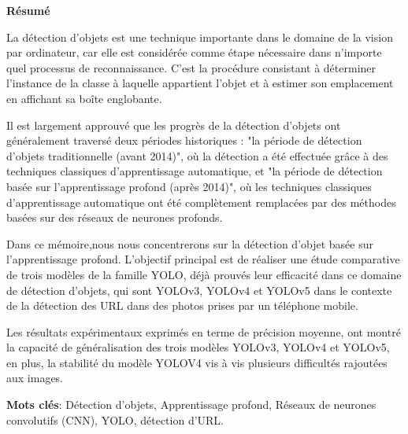 \newpage
\thispagestyle{empty}
\begin{center}
{\Large \textbf{Résumé}}
\end{center}
%

La détection d'objets est une technique importante dans le domaine de la vision par ordinateur, car elle est considérée comme étape nécessaire dans n'importe quel processus de reconnaissance. C'est la procédure consistant à déterminer l'instance de la classe à laquelle appartient l'objet et à estimer son emplacement en affichant sa boîte englobante. 

Il est largement approuvé que les progrès de la détection d'objets ont généralement traversé deux périodes historiques : "la période de détection d'objets traditionnelle (avant 2014)", où la détection  a été effectuée grâce à des techniques classiques d'apprentissage automatique, et "la période de détection basée sur l'apprentissage profond (après 2014)", où les techniques classiques d'apprentissage automatique ont été complètement remplacées par des méthodes basées sur des réseaux de neurones profonds. 

Dans ce mémoire,nous nous concentrerons sur la détection d'objet basée sur l'apprentissage profond. L'objectif principal  est de réaliser une étude comparative de trois modèles de la famille YOLO,  déjà prouvés leur efficacité dans ce domaine de détection d'objets, qui sont YOLOv3, YOLOv4 et YOLOv5 dans le contexte de la détection des URL dans des photos prises par un téléphone mobile. 

Les résultats expérimentaux exprimés en terme de précision moyenne, ont montré la capacité de généralisation des trois   modèles YOLOv3, YOLOv4 et YOLOv5, en plus, la stabilité du modèle YOLOV4 vis à vis plusieurs difficultés rajoutées aux images.

\vspace{0.5cm}
\textbf{Mots clés}: Détection d'objets, Apprentissage profond, Réseaux de neurones convolutifs (CNN), YOLO, détection d'URL.